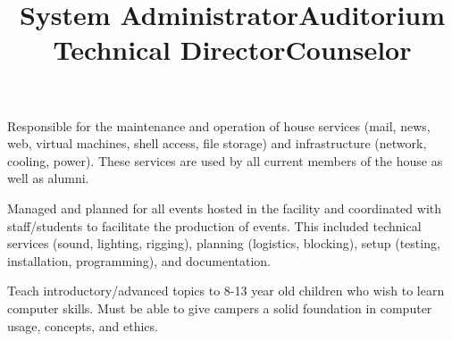 \begin{resume}
\title{System Administrator}
\begin{position}
Responsible for the maintenance and operation of house services (mail, news, web, virtual machines, shell access, file storage) and infrastructure (network, cooling, power). These services are used by all current members of the house as well as alumni.
\end{position}


\title{Auditorium Technical Director}
\begin{position}
Managed and planned for all events hosted in the facility and coordinated with staff/students to facilitate the production of events. This included technical services (sound, lighting, rigging), planning (logistics, blocking), setup (testing, installation, programming), and documentation. 
\end{position}

\title{Counselor}
\begin{position}
Teach introductory/advanced topics to 8-13 year old children who wish to learn computer skills. Must be able to give campers a solid foundation in computer usage, concepts, and ethics.
\end{position}

\begin{formatb}
  \\
  \body\\
\end{formatb}


\end{resume}
